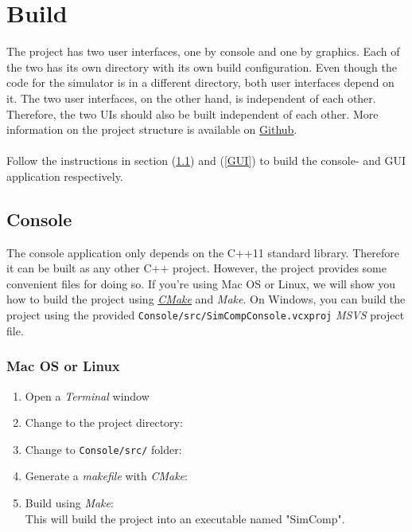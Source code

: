 \section{Build} \label{bygge}
The project has two user interfaces, one by console and one by graphics. Each of the two has its own directory with its own build configuration. Even though the code for the simulator is in a different directory, both user interfaces depend on it. The two user interfaces, on the other hand, is independent of each other. Therefore, the two UIs should also be built independent of each other. More information on the project structure is available on \href{https://github.com/LasseNatvig/SimComp}{Github}.
\\
\\
Follow the instructions in section (\ref{konsoll}) and (\ref{GUI}) to build the console- and GUI application respectively.

\subsection{Console} \label{konsoll}
The console application only depends on the C++11 standard library. Therefore it can be built as any other C++ project. However, the project provides some convenient files for doing so. If you're using Mac OS or Linux, we will show you how to build the project using \href{https://cmake.org}{\textit{CMake}} and \textit{Make}. On Windows, you can build the project using the provided \texttt{\textunderscore Console/\textunderscore src/SimComp\textunderscore Console.vcxproj} \textit{MSVS} project file.
\subsubsection{Mac OS or Linux}
\begin{enumerate}
    \item Open a \textit{Terminal} window
    \item Change to the project directory:
    \item Change to \texttt{\textunderscore Console/\textunderscore src/} folder:
    \item Generate a \textit{makefile} with \textit{CMake}:
    \item Build using \textit{Make}:
     \\
    This will build the project into an executable named "SimComp".
\end{enumerate}

